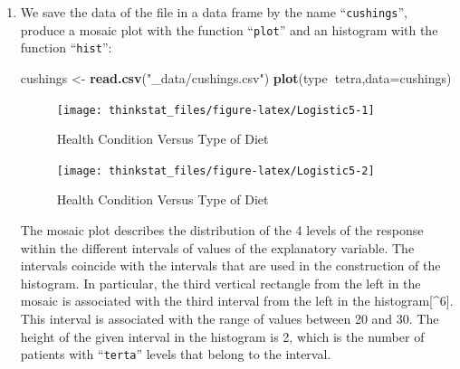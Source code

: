 \documentclass[]{krantz}
\makeatletter
\newenvironment{Shaded}{\begin{snugshade}}{\end{snugshade}}
\newcommand{\KeywordTok}[1]{\textcolor[rgb]{0.13,0.29,0.53}{\textbf{#1}}}
\newcommand{\DataTypeTok}[1]{\textcolor[rgb]{0.13,0.29,0.53}{#1}}
\newcommand{\StringTok}[1]{\textcolor[rgb]{0.31,0.60,0.02}{#1}}
\newcommand{\OperatorTok}[1]{\textcolor[rgb]{0.81,0.36,0.00}{\textbf{#1}}}
\newcommand{\NormalTok}[1]{#1}
\newenvironment{kframe}{%
\medskip{}
\setlength{\fboxsep}{.8em}
 \def\at@end@of@kframe{}%
 \ifinner\ifhmode%
  \def\at@end@of@kframe{\end{minipage}}%
  \begin{minipage}{\columnwidth}%
 \fi\fi%
 \def\FrameCommand##1{\hskip\@totalleftmargin \hskip-\fboxsep
 \colorbox{shadecolor}{##1}\hskip-\fboxsep
     \hskip-\linewidth \hskip-\@totalleftmargin \hskip\columnwidth}%
 \MakeFramed {\advance\hsize-\width
   \@totalleftmargin\z@ \linewidth\hsize
   \@setminipage}}%
 {\par\unskip\endMakeFramed%
 \at@end@of@kframe}
\renewenvironment{Shaded}{\begin{kframe}}{\end{kframe}}
\theoremstyle{definition}
\theoremstyle{definition}
\theoremstyle{definition}
\theoremstyle{remark}
\makeatother
\begin{document}
\begin{enumerate}
\def\labelenumi{\arabic{enumi}.}
\item
  We save the data of the file in a data frame by the name
  ``\texttt{cushings}'', produce a mosaic plot with the function
  ``\texttt{plot}'' and an histogram with the function
  ``\texttt{hist}'':

\begin{Shaded}
\begin{Highlighting}[]
\NormalTok{cushings <-}\StringTok{ }\KeywordTok{read.csv}\NormalTok{(}\StringTok{"_data/cushings.csv"}\NormalTok{)}
\KeywordTok{plot}\NormalTok{(type}\OperatorTok{~}\NormalTok{tetra,}\DataTypeTok{data=}\NormalTok{cushings)}
\end{Highlighting}
\end{Shaded}

  \begin{figure}

  {\centering \texttt{[image: thinkstat\_files/figure-latex/Logistic5-1]} 

  }

  \caption{Health Condition Versus Type of Diet}\label{fig:Logistic51}
  \end{figure}

\begin{Shaded}
\end{Shaded}

  \begin{figure}

  {\centering \texttt{[image: thinkstat\_files/figure-latex/Logistic5-2]} 

  }

  \caption{Health Condition Versus Type of Diet}\label{fig:Logistic52}
  \end{figure}

  The mosaic plot describes the distribution of the 4 levels of the
  response within the different intervals of values of the explanatory
  variable. The intervals coincide with the intervals that are used in
  the construction of the histogram. In particular, the third vertical
  rectangle from the left in the mosaic is associated with the third
  interval from the left in the histogram{[}\^{}6{]}. This interval is
  associated with the range of values between 20 and 30. The height of
  the given interval in the histogram is 2, which is the number of
  patients with ``\texttt{terta}'' levels that belong to the interval.


\end{enumerate}
\end{document}
